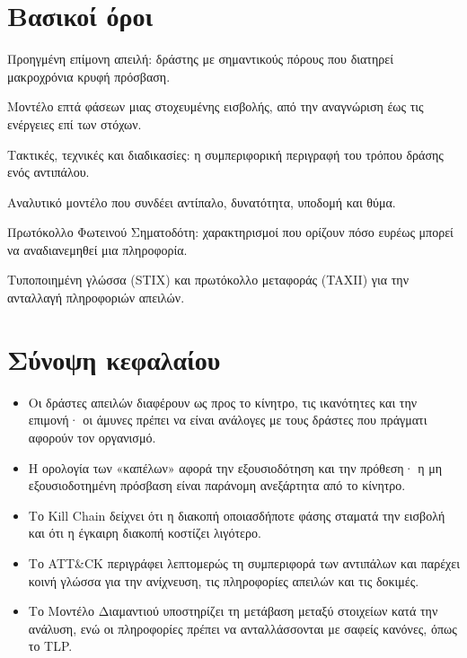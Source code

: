 \documentclass[11pt,openany]{book}
\begin{document}
\section*{Βασικοί όροι}
\begin{description}[style=nextline,leftmargin=1.2em]
  \item[APT] Προηγμένη επίμονη απειλή: δράστης με σημαντικούς πόρους που διατηρεί μακροχρόνια κρυφή πρόσβαση.
  \item[Kill Chain] Μοντέλο επτά φάσεων μιας στοχευμένης εισβολής, από την αναγνώριση έως τις ενέργειες επί των στόχων.
  \item[TTP] Τακτικές, τεχνικές και διαδικασίες: η συμπεριφορική περιγραφή του τρόπου δράσης ενός αντιπάλου.
  \item[Μοντέλο Διαμαντιού] Αναλυτικό μοντέλο που συνδέει αντίπαλο, δυνατότητα, υποδομή και θύμα.
  \item[TLP] Πρωτόκολλο Φωτεινού Σηματοδότη: χαρακτηρισμοί που ορίζουν πόσο ευρέως μπορεί να αναδιανεμηθεί μια πληροφορία.
  \item[STIX / TAXII] Τυποποιημένη γλώσσα (STIX) και πρωτόκολλο μεταφοράς (TAXII) για την ανταλλαγή πληροφοριών απειλών.
\end{description}

\section*{Σύνοψη κεφαλαίου}
\begin{itemize}
  \item Οι δράστες απειλών διαφέρουν ως προς το κίνητρο, τις ικανότητες και την επιμονή· οι άμυνες πρέπει να είναι ανάλογες με τους δράστες που πράγματι αφορούν τον οργανισμό.
  \item Η ορολογία των «καπέλων» αφορά την εξουσιοδότηση και την πρόθεση· η μη εξουσιοδοτημένη πρόσβαση είναι παράνομη ανεξάρτητα από το κίνητρο.
  \item Το Kill Chain δείχνει ότι η διακοπή οποιασδήποτε φάσης σταματά την εισβολή και ότι η έγκαιρη διακοπή κοστίζει λιγότερο.
  \item Το ATT\&CK περιγράφει λεπτομερώς τη συμπεριφορά των αντιπάλων και παρέχει κοινή γλώσσα για την ανίχνευση, τις πληροφορίες απειλών και τις δοκιμές.
  \item Το Μοντέλο Διαμαντιού υποστηρίζει τη μετάβαση μεταξύ στοιχείων κατά την ανάλυση, ενώ οι πληροφορίες πρέπει να ανταλλάσσονται με σαφείς κανόνες, όπως το TLP.
\end{itemize}
\end{document}
